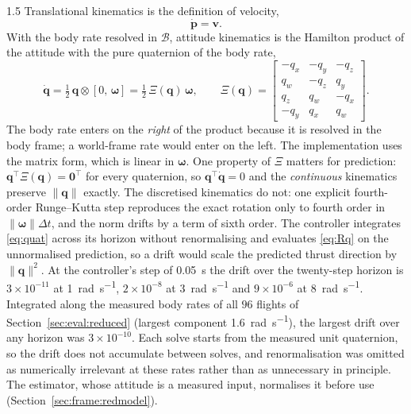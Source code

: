 \begin{spacing}{1.5}
Translational kinematics is the definition of velocity,
\begin{equation}
\dot{\bm{p}} = \bm{v}.
\label{eq:kin}
\end{equation}
With the body rate resolved in $\mathcal{B}$, attitude kinematics is the
Hamilton product of the attitude with the pure quaternion of the body rate,
\begin{equation}
\dot{\bm{q}} = \tfrac{1}{2}\, \bm{q} \otimes [0,\, \bm{\omega}]
= \tfrac{1}{2}\, \Xi(\bm{q})\, \bm{\omega},
\qquad
\Xi(\bm{q}) =
\begin{bmatrix}
-q_x & -q_y & -q_z \\
 q_w & -q_z &  q_y \\
 q_z &  q_w & -q_x \\
-q_y &  q_x &  q_w
\end{bmatrix}.
\label{eq:quat}
\end{equation}
The body rate enters on the \emph{right} of the product because it is resolved
in the body frame; a world-frame rate would enter on the left. The
implementation uses the matrix form, which is linear in $\bm\omega$.
One property of $\Xi$ matters for prediction: $\bm{q}^{\!\top}\Xi(\bm{q})=\bm 0^{\!\top}$
for every quaternion, so $\bm q^{\!\top}\dot{\bm q}=0$ and the \emph{continuous}
kinematics preserve $\lVert\bm q\rVert$ exactly. The discretised kinematics do
not: one explicit fourth-order Runge--Kutta step reproduces the exact rotation
only to fourth order in $\lVert\bm\omega\rVert\Delta t$, and the norm drifts
by a term of sixth order. The controller integrates \eqref{eq:quat} across its
horizon without renormalising and evaluates \eqref{eq:Rq} on the unnormalised
prediction, so a drift would scale the predicted thrust direction by
$\lVert\bm q\rVert^2$. At the controller's step of \SI{0.05}{\second} the drift
over the twenty-step horizon is $3\times10^{-11}$ at \SI{1}{\radian\per\second},
$2\times10^{-8}$ at \SI{3}{\radian\per\second} and $9\times10^{-6}$ at
\SI{8}{\radian\per\second}. Integrated along the measured body rates of all $96$
flights of Section~\ref{sec:eval:reduced} (largest component
\SI{1.6}{\radian\per\second}), the largest drift over any horizon was
$3\times10^{-10}$. Each solve starts from the measured unit quaternion, so the
drift does not accumulate between solves, and renormalisation was omitted as
numerically irrelevant at these rates rather than as unnecessary in principle.
The estimator, whose attitude is a measured input, normalises it before use
(Section~\ref{sec:frame:redmodel}).


\end{spacing}
